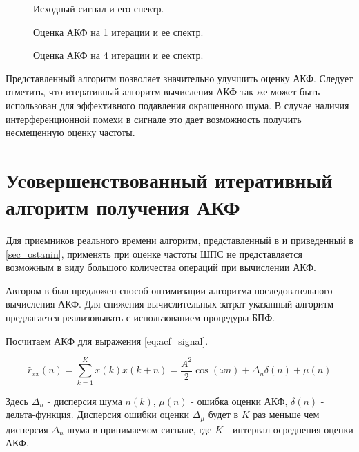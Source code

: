 \begin{figure}[h]
	\center{}
	\caption{Исходный сигнал и его спектр.}
	\label{pic:acf_0_iter}
\end{figure}

\begin{figure}[h]
	\center{}
	\caption{Оценка АКФ на 1 итерации и ее спектр.}
	\label{pic:acf_1_iter}
\end{figure}

\begin{figure}[h]
	\center{}
	\caption{Оценка АКФ на 4 итерации и ее спектр.}
	\label{pic:acf_4_iter}
\end{figure}

Представленный алгоритм позволяет значительно улучшить оценку АКФ. Следует отметить, что итеративный алгоритм вычисления АКФ так же
может быть использован для эффективного подавления окрашенного шума. В случае наличия интерференционной помехи в сигнале это дает
возможность получить несмещенную оценку частоты.

\section{Усовершенствованный итеративный алгоритм получения АКФ}
\label{sec_acf_fft}
Для приемников реального времени алгоритм, представленный в \cite{ostanin_akf} и приведенный в \ref{sec_ostanin}, применять при оценке 
частоты ШПС не представляется возможным в виду большого количества операций при вычислении АКФ.

Автором в \cite{my_acf} был предложен способ оптимизации алгоритма последовательного вычисления АКФ.
Для снижения вычислительных затрат указанный алгоритм предлагается реализовывать с использованием процедуры БПФ. 

Посчитаем АКФ для выражения \ref{eq:acf_signal}.
\begin{center}
\begin{equation}
	\label{eq:lpc_akf_n}
	\hat{r}_{xx}(n) = \sum \limits_{k=1}^{K} x(k)x(k+n) = \frac{A^2}{2} \cos{(\omega{n})} + \Delta_n \delta{(n)} + \mu{(n)}
\end{equation}
\end{center}

Здесь ${\Delta_n}$ - дисперсия шума ${n(k)}$, ${\mu{(n)}}$ - ошибка оценки АКФ, ${\delta{(n)}}$ - дельта-функция. Дисперсия ошибки
оценки ${\Delta_{\mu}}$ будет в ${K}$ раз меньше чем дисперсия ${\Delta_n}$ шума в принимаемом сигнале, где ${K}$ - интервал
осреднения оценки АКФ.

